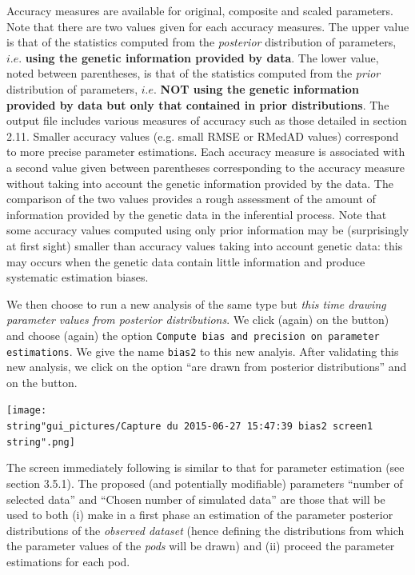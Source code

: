 Accuracy measures are available for original, composite and scaled
parameters. Note that there are two values given for each accuracy
measures. The upper value is that of the statistics computed from
the \emph{posterior} distribution of parameters, $i.e.$ \textbf{using
the genetic information provided by data}. The lower value, noted
between parentheses, is that of the statistics computed from the \emph{prior}
distribution of parameters, $i.e.$ \textbf{NOT using the genetic
information provided by data but only that contained in prior distributions}.
The output file includes various measures of accuracy such as those
detailed in section 2.11. Smaller accuracy values (e.g. small RMSE
or RMedAD values) correspond to more precise parameter estimations.
Each accuracy measure is associated with a second value given between
parentheses corresponding to the accuracy measure without taking into
account the genetic information provided by the data. The comparison
of the two values provides a rough assessment of the amount of information
provided by the genetic data in the inferential process. Note that
some accuracy values computed using only prior information may be
(surprisingly at first sight) smaller than accuracy values taking
into account genetic data: this may occurs when the genetic data contain
little information and produce systematic estimation biases.

We then choose to run a new analysis of the same type but \emph{this
time drawing parameter values from posterior distributions}. We click
(again) on the  button) and choose
(again) the option \texttt{Compute bias and precision on parameter
estimations}. We give the name \texttt{bias2} to this new analyis.
After validating this new analysis, we click on the option ``are
drawn from posterior distributions'' and on the 
button.

\texttt{[image: \\string"gui\_pictures/Capture du 2015-06-27 15:47:39 bias2 screen1\\string".png]}

The screen immediately following is similar to that for parameter
estimation (see section 3.5.1). The proposed (and potentially modifiable)
parameters ``number of selected data'' and ``Chosen number of simulated
data'' are those that will be used to both (i) make in a first phase
an estimation of the parameter posterior distributions of the \emph{observed
dataset} (hence defining the distributions from which the parameter
values of the \emph{pods} will be drawn) and (ii) proceed the parameter
estimations for each pod.

